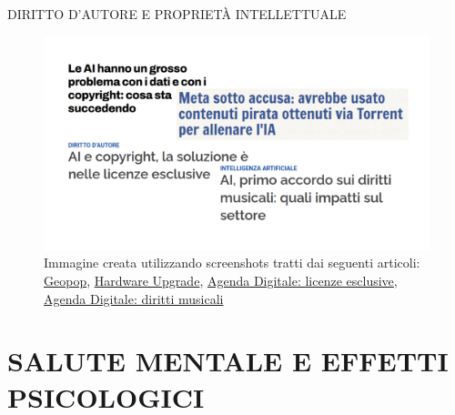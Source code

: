 \documentclass[aspectratio=1610]{beamer}
\begin{document}
\begin{frame}{DIRITTO D'AUTORE E PROPRIETÀ INTELLETTUALE}
    \begin{figure}
        \includegraphics[width=.9\linewidth]{img/copyright.png}
        \caption{
            Immagine creata utilizzando screenshots tratti dai seguenti articoli:
            \href{https://www.geopop.it/le-ai-hanno-un-grosso-problema-con-i-dati-e-con-i-copyright-cosa-sta-succedendo/}{Geopop}, 
            \href{https://www.hwupgrade.it/news/web/meta-sotto-accusa-avrebbe-usato-contenuti-pirata-ottenuti-via-torrent-per-allenare-l-ia_134519.html}{Hardware Upgrade}, 
            \href{https://www.agendadigitale.eu/mercati-digitali/addestramento-delle-ai-le-licenze-esclusive-sono-la-via-per-uno-sviluppo-equo/}{Agenda Digitale: licenze esclusive}, 
            \href{https://www.agendadigitale.eu/mercati-digitali/ai-primo-accordo-sui-diritti-musicali-quali-impatti-sul-settore/}{Agenda Digitale: diritti musicali}
        }
    \end{figure}
\end{frame}

\section{SALUTE MENTALE E EFFETTI PSICOLOGICI}
\end{document}

